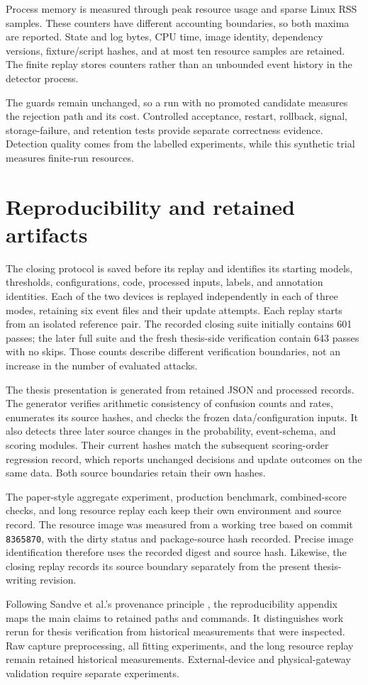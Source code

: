 Process memory is measured through peak resource usage and sparse Linux
RSS samples. These counters have different accounting boundaries, so
both maxima are reported. State and log bytes, CPU time, image identity,
dependency versions, fixture/script hashes, and at most ten resource
samples are retained. The finite replay stores counters rather than an
unbounded event history in the detector process.

The guards remain unchanged, so a run with no promoted candidate measures
the rejection path and its cost. Controlled acceptance,
restart, rollback, signal, storage-failure, and retention tests provide
separate correctness evidence. Detection quality comes from the labelled
experiments, while this synthetic trial measures finite-run resources.

\section{Reproducibility and retained artifacts}
\label{sec:experimental-provenance}

The closing protocol is saved before its replay and identifies its
starting models, thresholds, configurations, code, processed inputs,
labels, and annotation identities. Each of the two devices is replayed
independently in each of three modes, retaining six event files and their
update attempts. Each replay starts from an isolated reference pair.
The recorded closing suite initially contains 601 passes; the later full
suite and the fresh thesis-side verification contain 643 passes with no
skips. Those counts describe different verification boundaries, not an
increase in the number of evaluated attacks.

The thesis presentation is generated from retained JSON and processed
records. The generator verifies arithmetic consistency of confusion
counts and rates, enumerates its source hashes, and checks the frozen
data/configuration inputs. It also detects three later source changes in
the probability, event-schema, and scoring modules. Their current hashes
match the subsequent scoring-order regression record, which reports
unchanged decisions and update outcomes on the same data. Both source
boundaries retain their own hashes.

The paper-style aggregate experiment, production benchmark, combined-score
checks, and long resource replay each keep their own environment and
source record. The resource image was measured from a working tree based
on commit \texttt{8365870}, with the dirty status and package-source hash
recorded. Precise image identification therefore uses the recorded digest
and source hash.
Likewise, the closing replay records its source boundary separately from
the present thesis-writing revision.

Following Sandve et al.'s provenance principle \cite{sandve2013}, the
reproducibility appendix maps the main claims to retained paths and
commands. It distinguishes work rerun for thesis verification from
historical measurements that were inspected. Raw capture preprocessing,
all fitting experiments, and the long resource replay remain retained
historical measurements. External-device and physical-gateway validation
require separate experiments.
